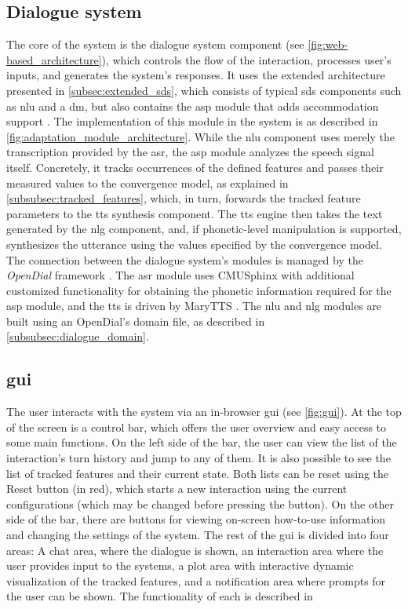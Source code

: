 \subsection{Dialogue system}
\label{subsec:dialogue_system}

The core of the system is the dialogue system component (see \cref{fig:web-based_architecture}), which controls the flow of the interaction, processes user's inputs, and generates the system's responses.
It uses the extended architecture presented in \cref{subsec:extended_sds}, which consists of typical \ac{sds} components such as \ac{nlu} and a \ac{dm}, but also contains the \ac{asp}  module that adds accommodation support \citep{Raveh2017SemDial}.
The implementation of this module in the system is as described in \cref{fig:adaptation_module_architecture}.
While the \ac{nlu} component uses merely the transcription provided by the \ac{asr}, the \ac{asp} module analyzes the speech signal itself.
Concretely, it tracks occurrences of the defined features and passes their measured values to the convergence model, as explained in \cref{subsubsec:tracked_features}, which, in turn, forwards the tracked feature parameters to the \ac{tts} synthesis component.
The \ac{tts} engine then takes the text generated by the \ac{nlg} component, and, if phonetic-level manipulation is supported, synthesizes the utterance using the values specified by the convergence model.
The connection between the dialogue system's modules is managed by the \emph{OpenDial} framework \citep{Lison2016opendial}.
The \ac{asr} module uses CMUSphinx \citep{Lamere2003sphinx} with additional customized functionality for obtaining the phonetic information required for the \ac{asp} module, and the \ac{tts} is driven by MaryTTS \citep{LeMaguer2017uprooted, Schroeder2003mary}.
The \ac{nlu} and \ac{nlg} modules are built using an OpenDial's domain file, as described in \cref{subsubsec:dialogue_domain}.

\subsection{\Acl{gui}}
\label{subsec:graphical_user_interface}

The user interacts with the system via an in-browser \ac{gui} (see \cref{fig:gui}).
At the top of the screen is a control bar, which offers the user overview and easy access to some main functions.
On the left side of the bar, the user can view the list of the interaction's turn history and jump to any of them.
It is also possible to see the list of tracked features and their current state.
Both lists can be reset using the Reset button (in red), which starts a new interaction using the current configurations (which may be changed before pressing the button).
On the other side of the bar, there are buttons for viewing on-screen how-to-use information and changing the settings of the system.
The rest of the \ac{gui} is divided into four areas:
A chat area, where the dialogue is shown,
an interaction area where the user provides input to the systems,
a plot area with interactive dynamic visualization of the tracked features,
and a notification area where prompts for the user can be shown.
The functionality of each is described in 

